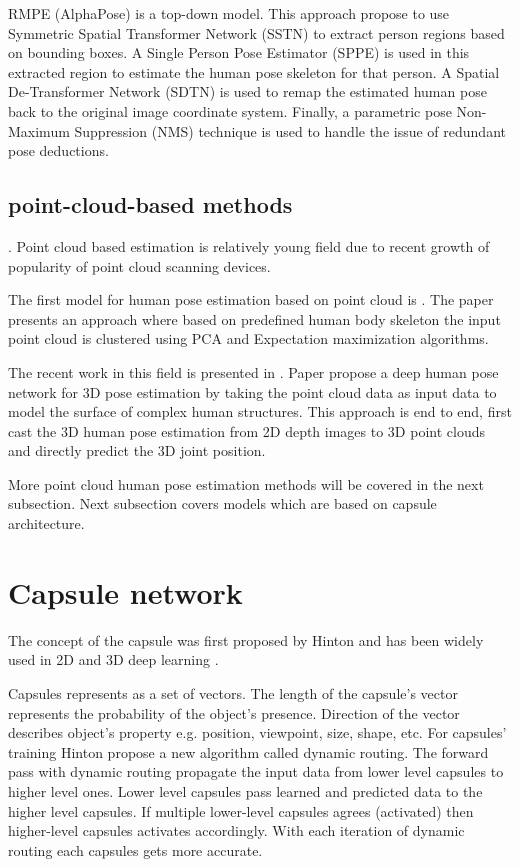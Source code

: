 RMPE (AlphaPose) \parencite{fang_rmpe_2018} is a top-down model. This approach propose to use Symmetric Spatial Transformer Network (SSTN) to extract person regions based on bounding boxes. A Single Person Pose Estimator (SPPE) is used in this extracted region to estimate the human pose skeleton for that person. A Spatial De-Transformer Network (SDTN) is used to remap the estimated human pose back to the original image coordinate system. Finally, a parametric pose Non-Maximum Suppression (NMS) technique is used to handle the issue of redundant pose deductions.

\subsection{point-cloud-based methods}. Point cloud based estimation is relatively young field due to recent growth of popularity of point cloud scanning devices.

The first model for human pose estimation based on point cloud is \parencite{diaz_barros_real-time_2015}. The paper presents an approach where based on predefined human body skeleton the input point cloud is clustered using PCA and Expectation maximization algorithms.

The recent work in this field is presented in \parencite{zhou_learning_2020}. Paper propose a deep human pose network for 3D pose estimation by taking the point cloud data as input data to model the surface of complex human structures. This approach is end to end, first cast the 3D human pose estimation from 2D depth images to 3D point clouds and directly predict the 3D joint position.

More point cloud human pose estimation methods will be covered in the next subsection. Next subsection covers models which are based on capsule architecture.

\section{Capsule network}
The concept of the capsule was first proposed by Hinton \parencite{sabour_dynamic_2017} and has been widely used in 2D and 3D deep learning \parencite{kakillioglu_3d_2020, qin_detecting_2020, duarte_videocapsulenet_2018, lalonde_capsules_2018}.

Capsules represents as a set of vectors. The length of the capsule's vector represents the probability of the object's presence. Direction of the vector describes object's property e.g. position, viewpoint, size, shape, etc. For capsules' training Hinton propose a new algorithm \parencite{sabour_dynamic_2017} called dynamic routing. The forward pass with dynamic routing propagate the input data from lower level capsules to higher level ones. Lower level capsules pass learned and predicted data to the higher level capsules. If multiple lower-level capsules agrees (activated) then higher-level capsules activates accordingly. With each iteration of dynamic routing each capsules gets more accurate.

